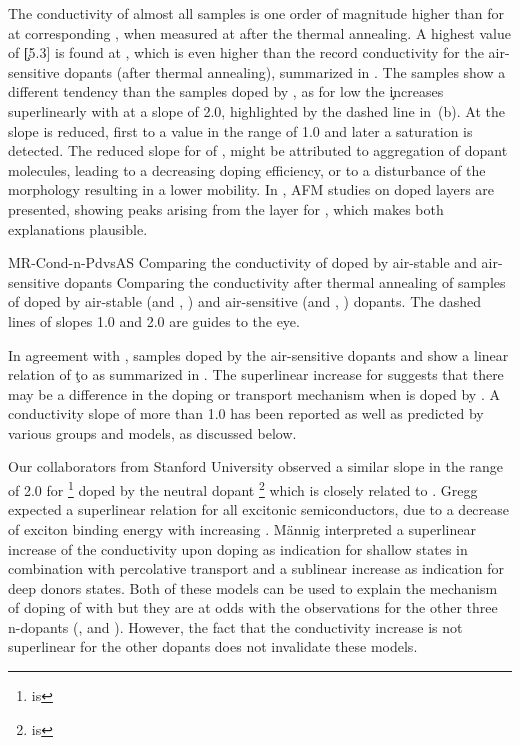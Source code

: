 The conductivity of almost all \dmbi samples is one order of magnitude higher than for \aob at corresponding \CLongs, when measured at \T[25] after the thermal annealing.
A highest value of \c[5.3] is found at \C[0.650], which is even  higher than the record conductivity for the air-sensitive dopants (after thermal annealing), summarized in .
The \dmbi samples show a different tendency than the samples doped by \aob, as for low \C the \c increases superlinearly with \C at a slope of 2.0, highlighted by the dashed line in \,(b). At  the slope is reduced, first to a value in the range of 1.0 and later a saturation is detected.
The reduced slope for  of \dmbi, might be attributed to aggregation of dopant molecules, leading to a decreasing doping efficiency\cite{Mityashin2012a}, or to a disturbance of the morphology resulting in a lower mobility\cite{Kleemann2012a}. In , AFM studies on doped layers are presented, showing peaks arising from the layer for , which makes both explanations plausible.

\cBild
{MR-Cond-n-PdvsAS}
{Comparing the conductivity of \CS doped by air-stable and air-sensitive dopants}
{Comparing the conductivity after thermal annealing of samples of \CS doped by air-stable (\aob and \dmbi, \T[25]) and air-sensitive (\CrPd and \WPd, \T[30]) dopants. The dashed lines of slopes 1.0 and 2.0 are guides to the eye.}

In agreement with \aob, samples doped by the air-sensitive dopants \CrPd and \WPd show a linear relation of \c to \C as summarized in .
The superlinear increase for \dmbi suggests that there may be a difference in the doping or transport mechanism when \CS is doped by \dmbi. A conductivity slope of more than 1.0 has been reported as well as predicted by various groups and models, as discussed below.

Our collaborators from Stanford University observed a similar slope in the range of 2.0 for \PCBM\footnote{\PCBM is \PCBMLong} doped by the neutral dopant \Ndmbi\footnote {\Ndmbi is \NdmbiLong} which is closely related to \dmbi\cite{Wei2010}.
Gregg\etal\cite{Gregg2004Review} expected a superlinear relation for all excitonic semiconductors, due to a decrease of exciton binding energy with increasing \CLong.
Männig\etal\cite{Maennig2001} interpreted a superlinear increase of the conductivity upon doping as indication for shallow states in combination with percolative transport and a sublinear increase as indication for deep donors states.
%
Both of these models can be used to explain the mechanism of doping of \CS with \dmbi but they are at odds with the observations for the other three n-dopants (\aob, \CrPd and \WPd). However, the fact that the conductivity increase is not superlinear for the other dopants does not invalidate these models.

